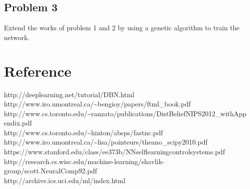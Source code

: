 \documentclass[11pt]{article}
\begin{document}
\subsection{Problem 3}
Extend the works of problem 1 and 2 by using a genetic algorithm to train the network.



\section{Reference}

http://deeplearning.net/tutorial/DBN.html\\
http://www.iro.umontreal.ca/\textasciitilde bengioy/papers/ftml\_book.pdf\\
http://www.cs.toronto.edu/\textasciitilde ranzato/publications/DistBeliefNIPS2012\_withAppendix.pdf\\
http://www.cs.toronto.edu/\textasciitilde hinton/absps/fastnc.pdf\\
http://www.iro.umontreal.ca/\textasciitilde lisa/pointeurs/theano\_scipy2010.pdf\\
https://www.stanford.edu/class/ee373b/NNselflearningcontrolsystems.pdf\\
http://research.cs.wisc.edu/machine-learning/shavlik-group/scott.NeuralComp92.pdf\\
http://archive.ics.uci.edu/ml/index.html\\
\end{document}
